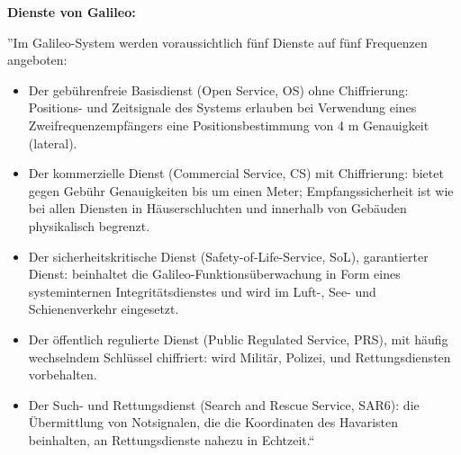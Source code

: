 \documentclass[letterpaper,11pt,ngerman]{andi}
\begin{document}
\textbf{Dienste von Galileo:}

”Im Galileo-System werden voraussichtlich fünf Dienste auf fünf Frequenzen angeboten:
\begin{itemize}
\item {} 
Der gebührenfreie Basisdienst (Open Service, OS) ohne Chiffrierung: Positions- und Zeitsignale des Systems erlauben bei Verwendung eines Zweifrequenzempfängers eine Positionsbestimmung von 4 m Genauigkeit (lateral).

\item {} 
Der kommerzielle Dienst (Commercial Service, CS) mit Chiffrierung: bietet gegen Gebühr Genauigkeiten bis um einen Meter; Empfangssicherheit ist wie bei allen Diensten in Häuserschluchten und innerhalb von Gebäuden physikalisch begrenzt.

\item {} 
Der sicherheitskritische Dienst (Safety-of-Life-Service, SoL), garantierter Dienst: beinhaltet die Galileo-Funktionsüberwachung in Form eines systeminternen Integritätsdienstes und wird im Luft-, See- und Schienenverkehr eingesetzt.

\item {} 
Der öffentlich regulierte Dienst (Public Regulated Service, PRS), mit häufig wechselndem Schlüssel chiffriert: wird Militär, Polizei, und Rettungsdiensten vorbehalten.

\item {} 
Der Such- und Rettungsdienst (Search and Rescue Service, SAR6): die Übermittlung von Notsignalen, die die Koordinaten des Havaristen beinhalten, an Rettungsdienste nahezu in Echtzeit.“ \cite{sat_nav_dodel}

\end{itemize}
\vspace{0.5cm}
\end{document}
